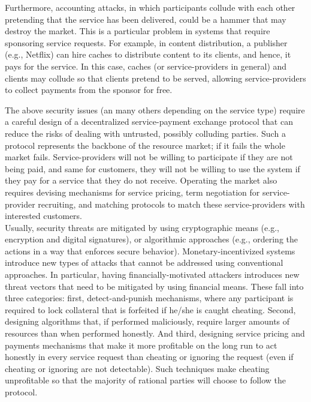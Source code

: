 \documentclass{llncs}
\begin{document}
Furthermore, accounting attacks, in which participants collude with each other pretending that the service has been delivered, could be a hammer that may destroy the market. This is a particular problem in systems that require sponsoring service requests. For example, in content distribution, a publisher (e.g., Netflix) can hire caches to distribute content to its clients, and hence, it pays for the service. In this case, caches (or service-providers in general) and clients may collude so that clients pretend to be served, allowing service-providers to collect payments from the sponsor for free.


The above security issues (an many others depending on the service type) require a careful design of a decentralized service-payment exchange protocol that can reduce the risks of dealing with untrusted, possibly colluding parties. Such a protocol represents the backbone of the resource market; if it fails the whole market fails. Service-providers will not be willing to participate if they are not being paid, and same for customers, they will not be willing to use the system if they pay for a service that they do not receive. Operating the market also requires devising mechanisms for service pricing, term negotiation for service-provider recruiting, and matching protocols to match these service-providers with interested customers. \\


 Usually, security threats are mitigated by using cryptographic means (e.g., encryption and digital signatures), or algorithmic approaches (e.g., ordering the actions in a way that enforces secure behavior). Monetary-incentivized systems introduce new types of attacks that cannot be addressed using conventional approaches. In particular, having financially-motivated attackers introduces new threat vectors that need to be mitigated by using financial means. These fall into three categories: first, detect-and-punish mechanisms, where any participant is required to lock collateral that is forfeited if he/she is caught cheating. Second, designing algorithms that, if performed maliciously, require larger amounts of resources than when performed honestly. And third, designing service pricing and payments mechanisms that make it more profitable on the long run to act honestly in every service request than cheating or ignoring the request (even if cheating or ignoring are not detectable). Such techniques make cheating unprofitable so that the majority of rational parties will choose to follow the protocol.
\end{document}
